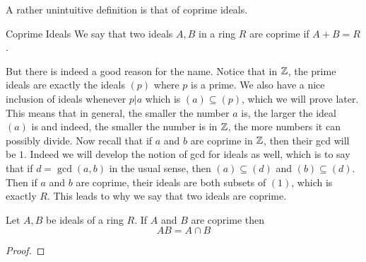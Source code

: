 \documentclass[a4paper]{article}
\begin{document}
A rather unintuitive definition is that of coprime ideals. 

\begin{defn}{Coprime Ideals}{} We say that two ideals $A,B$ in a ring $R$ are coprime if $A+B=R$. 
\end{defn}

But there is indeed a good reason for the name. Notice that in $\mathbb{Z}$, the prime ideals are exactly the ideals $(p)$ where $p$ is a prime. We also have a nice inclusion of ideals whenever $p|a$ which is $(a)\subseteq(p)$, which we will prove later. This means that in general, the smaller the number $a$ is, the larger the ideal $(a)$ is and indeed, the smaller the number is in $\mathbb{Z}$, the more numbers it can possibly divide. Now recall that if $a$ and $b$ are coprime in $\mathbb{Z}$, then their gcd will be $1$. Indeed we will develop the notion of gcd for ideals as well, which is to say that if $d=\gcd(a,b)$ in the usual sense, then $(a)\subseteq(d)$ and $(b)\subseteq(d)$. Then if $a$ and $b$ are coprime, their ideals are both subsets of $(1)$, which is exactly $R$. This leads to why we say that two ideals are coprime. 

\begin{prp}{}{} Let $A,B$ be ideals of a ring $R$. If $A$ and $B$ are coprime then $$AB=A\cap B$$ \tcbline
\begin{proof}

\end{proof}
\end{prp}
\end{document}
